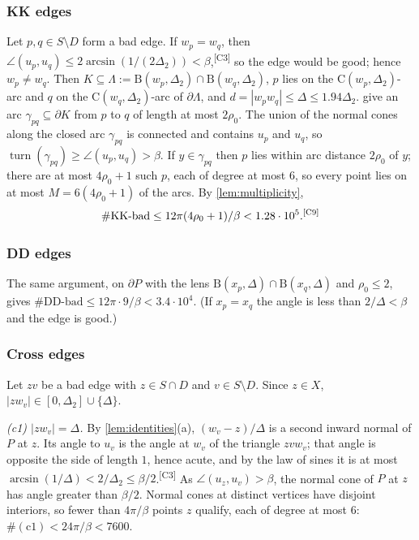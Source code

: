 \documentclass[11pt]{amsart}
\theoremstyle{definition}
\theoremstyle{remark}
\newcommand{\Dt}{\Delta_2}
\newcommand{\turn}{\operatorname{turn}}
\newcommand{\Cc}{\mathrm{C}}      %
\newcommand{\Dd}{\mathrm{B}}      %
\newcommand{\chk}[1]{\textsuperscript{[#1]}}
\begin{document}
\subsubsection*{KK edges}
Let $p,q\in S\setminus D$ form a bad edge. If $w_p=w_q$, then $\angle(u_p,u_q)\le2\arcsin(1/(2\Dt))<\beta$,\chk{C3} so the edge would be good; hence $w_p\neq w_q$. Then $K\subseteq\Lambda:=\Dd(w_p,\Dt)\cap\Dd(w_q,\Dt)$, $p$ lies on the $\Cc(w_p,\Dt)$-arc and $q$ on the $\Cc(w_q,\Dt)$-arc of $\partial\Lambda$, and $d=|w_pw_q|\le\Delta\le1.94\Dt$.  give an arc $\gamma_{pq}\subseteq\partial K$ from $p$ to $q$ of length at most $2\rho_0$. The union of the normal cones along the closed arc $\gamma_{pq}$ is connected and contains $u_p$ and $u_q$, so $\turn(\gamma_{pq})\ge\angle(u_p,u_q)>\beta$. If $y\in\gamma_{pq}$ then $p$ lies within arc distance $2\rho_0$ of $y$; there are at most $4\rho_0+1$ such $p$, each of degree at most $6$, so every point lies on at most $M=6(4\rho_0+1)$ of the arcs. By \cref{lem:multiplicity},
\[
\#\text{KK-bad}\le 12\pi(4\rho_0+1)/\beta<1.28\cdot10^5.\chk{C9}
\]

\subsubsection*{DD edges}
The same argument, on $\partial P$ with the lens $\Dd(x_p,\Delta)\cap\Dd(x_q,\Delta)$ and $\rho_0\le 2$, gives $\#\text{DD-bad}\le 12\pi\cdot 9/\beta<3.4\cdot10^4$. (If $x_p=x_q$ the angle is less than $2/\Delta<\beta$ and the edge is good.)

\subsubsection*{Cross edges}
Let $zv$ be a bad edge with $z\in S\cap D$ and $v\in S\setminus D$. Since $z\in X$, $|zw_v|\in[0,\Dt]\cup\{\Delta\}$.

\emph{(c1) $|zw_v|=\Delta$.} By \cref{lem:identities}(a), $(w_v-z)/\Delta$ is a second inward normal of $P$ at $z$. Its angle to $u_v$ is the angle at $w_v$ of the triangle $zvw_v$; that angle is opposite the side of length $1$, hence acute, and by the law of sines it is at most $\arcsin(1/\Delta)<2/\Dt\le\beta/2$.\chk{C3} As $\angle(u_z,u_v)>\beta$, the normal cone of $P$ at $z$ has angle greater than $\beta/2$. Normal cones at distinct vertices have disjoint interiors, so fewer than $4\pi/\beta$ points $z$ qualify, each of degree at most $6$: $\#(\mathrm{c1})<24\pi/\beta<7600$.
\end{document}
